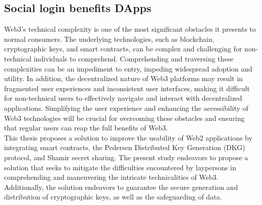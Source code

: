 \documentclass[../Main.tex]{subfiles}
\begin{document}
\subsection{Social login benefits DApps}
Web3's technical complexity is one of the most significant obstacles it presents to normal consumers. The underlying technologies, such as blockchain, cryptographic keys, and smart contracts, can be complex and challenging for non-technical individuals to comprehend. Comprehending and traversing these complexities can be an impediment to entry, impeding widespread adoption and utility. In addition, the decentralized nature of Web3 platforms may result in fragmented user experiences and inconsistent user interfaces, making it difficult for non-technical users to effectively navigate and interact with decentralized applications. Simplifying the user experience and enhancing the accessibility of Web3 technologies will be crucial for overcoming these obstacles and ensuring that regular users can reap the full benefits of Web3.\\
This thesis proposes a solution to improve the usability of Web2 \cite{oreilly2005web2} applications by integrating smart contracts, the Pedersen Distributed Key Generation (DKG) protocol, and Shamir secret sharing. The present study endeavors to propose a solution that seeks to mitigate the difficulties encountered by laypersons in comprehending and maneuvering the intricate technicalities of Web3. Additionally, the solution endeavors to guarantee the secure generation and distribution of cryptographic keys, as well as the safeguarding of data.








\end{document}
